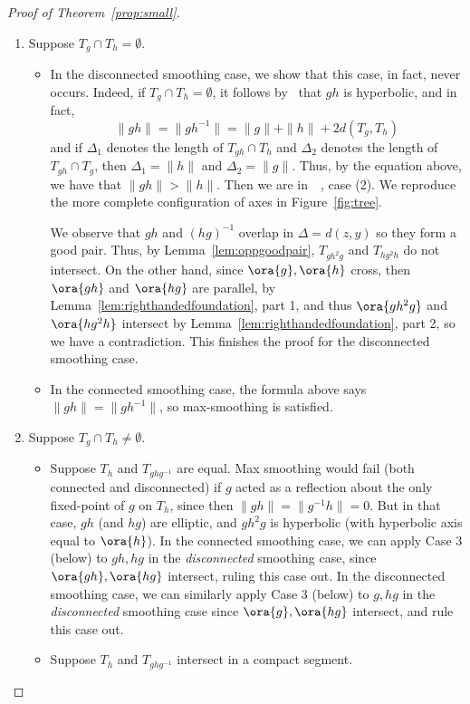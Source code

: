 \begin{proof}[Proof of Theorem~\ref{prop:small}]
\begin{enumerate}[wide, labelindent=0pt]
\begin{enumerate}
\item Suppose $T_g \cap T_h = \emptyset$. 
\begin{itemize}[wide, labelindent=0pt] 
\item In the disconnected smoothing case, we show that this case, in fact, never occurs. Indeed, if $T_g \cap T_h = \emptyset$, it follows by~\cite[Lemma~3.2]{Chi01:LambdaTrees} that $gh$ is hyperbolic, and in fact,
 \[
 \| g h \| = \| gh^{-1} \| = \| g \| + \| h \| + 2d(T_g, T_h)
 \]
 and if $\Delta_1$ denotes the length of $T_{gh} \cap T_h$ and $\Delta_2$ denotes the length of $T_{gh} \cap T_g$, then $\Delta_1=\|h\|$ and $\Delta_2=\|g\|$.
 Thus, by the equation above, we have that $\|gh \| > \|h\|$.
 Then we are in~~\cite[Proposition~1.7]{Pa89:Paulin1989TheGT}, case (2). We reproduce the more complete configuration of axes in Figure~\ref{fig:tree}.
 
      \begin{figure}
\end{figure}

We observe that $g h$ and $(h g)^{-1}$ overlap in $\Delta=d(z,y)$ so they form a good pair. Thus,  by Lemma~\ref{lem:oppgoodpair}, $T_{g h^2 g}$ and $T_{h g^2 h}$ do not intersect.
On the other hand, since $\ora{g},\ora{h}$ cross, then $\ora{gh}$ and $\ora{hg}$ are parallel, by Lemma~\ref{lem:righthandedfoundation}, part 1, and thus $\ora{gh^2g}$ and $\ora{hg^2h}$ intersect by Lemma~\ref{lem:righthandedfoundation}, part 2, so we have a contradiction. This finishes the proof for the disconnected smoothing case.
\item  In the connected smoothing case, the formula above says $\| g h \| = \| gh^{-1} \|$, so max-smoothing is satisfied.
\end{itemize}
\item  Suppose $T_g \cap T_h \neq \emptyset$. 
\begin{itemize}[wide, labelindent=0pt]
\item Suppose $T_h$ and $T_{ghg^{-1}}$ are equal. Max smoothing would fail (both connected and disconnected) if $g$ acted as a reflection about the only fixed-point of $g$ on $T_h$, since then $\| gh \|=\| g^{-1}h \|=0$. 
But in that case, $gh$ (and $hg$) are elliptic, and $gh^2g$ is hyperbolic (with hyperbolic axis equal to $\ora{h}$).
In the connected smoothing case, we can apply Case 3 (below) to $gh, hg$ in the \emph{disconnected} smoothing case, since $\ora{gh},\ora{hg}$ intersect, ruling this case out.
In the disconnected smoothing case, we can similarly apply Case 3 (below) to $g, hg$ in the \emph{disconnected} smoothing case
since $\ora{g},\ora{hg}$ intersect, and rule this case out.
\item Suppose $T_h$ and $T_{ghg^{-1}}$ intersect in a compact segment.


\end{itemize}
\end{enumerate}
\end{enumerate}
\end{proof}
